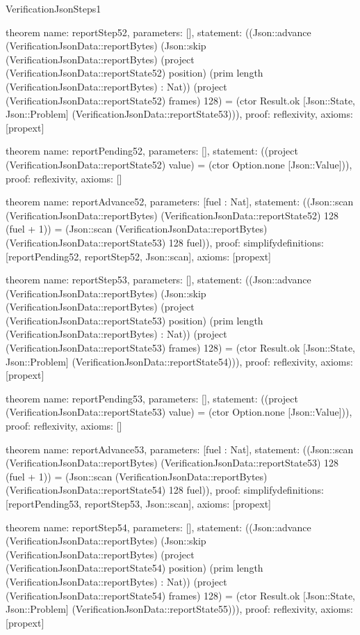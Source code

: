 \begin{lexlean}{VerificationJsonSteps1}
\begin{semanticmodule}
theorem{
  name: reportStep52,
  parameters: [],
  statement: ((Json::advance (VerificationJsonData::reportBytes) (Json::skip (VerificationJsonData::reportBytes) (project (VerificationJsonData::reportState52) position) (prim length (VerificationJsonData::reportBytes) : Nat)) (project (VerificationJsonData::reportState52) frames) 128) = (ctor Result.ok [Json::State, Json::Problem] (VerificationJsonData::reportState53))),
  proof: reflexivity{},
  axioms: [propext]
}

theorem{
  name: reportPending52,
  parameters: [],
  statement: ((project (VerificationJsonData::reportState52) value) = (ctor Option.none [Json::Value])),
  proof: reflexivity{},
  axioms: []
}

theorem{
  name: reportAdvance52,
  parameters: [fuel : Nat],
  statement: ((Json::scan (VerificationJsonData::reportBytes) (VerificationJsonData::reportState52) 128 (fuel + 1)) = (Json::scan (VerificationJsonData::reportBytes) (VerificationJsonData::reportState53) 128 fuel)),
  proof: simplify{definitions: [reportPending52, reportStep52, Json::scan]},
  axioms: [propext]
}

theorem{
  name: reportStep53,
  parameters: [],
  statement: ((Json::advance (VerificationJsonData::reportBytes) (Json::skip (VerificationJsonData::reportBytes) (project (VerificationJsonData::reportState53) position) (prim length (VerificationJsonData::reportBytes) : Nat)) (project (VerificationJsonData::reportState53) frames) 128) = (ctor Result.ok [Json::State, Json::Problem] (VerificationJsonData::reportState54))),
  proof: reflexivity{},
  axioms: [propext]
}

theorem{
  name: reportPending53,
  parameters: [],
  statement: ((project (VerificationJsonData::reportState53) value) = (ctor Option.none [Json::Value])),
  proof: reflexivity{},
  axioms: []
}

theorem{
  name: reportAdvance53,
  parameters: [fuel : Nat],
  statement: ((Json::scan (VerificationJsonData::reportBytes) (VerificationJsonData::reportState53) 128 (fuel + 1)) = (Json::scan (VerificationJsonData::reportBytes) (VerificationJsonData::reportState54) 128 fuel)),
  proof: simplify{definitions: [reportPending53, reportStep53, Json::scan]},
  axioms: [propext]
}

theorem{
  name: reportStep54,
  parameters: [],
  statement: ((Json::advance (VerificationJsonData::reportBytes) (Json::skip (VerificationJsonData::reportBytes) (project (VerificationJsonData::reportState54) position) (prim length (VerificationJsonData::reportBytes) : Nat)) (project (VerificationJsonData::reportState54) frames) 128) = (ctor Result.ok [Json::State, Json::Problem] (VerificationJsonData::reportState55))),
  proof: reflexivity{},
  axioms: [propext]
}


\end{semanticmodule}
\end{lexlean}
